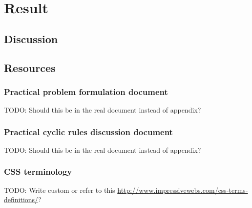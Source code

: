 \documentclass[a4paper,11pt]{kth-mag}
\begin{document}
  \part{Result}
    \chapter{Discussion}
  \printbibliography
    \appendix
    \addappheadtotoc
      \chapter{Resources}
        \section{Practical problem formulation document}\label{sec:problem-formulation}
          TODO: Should this be in the real document instead of appendix?          
        \section{Practical cyclic rules discussion document}\label{sec:cyclic-rules}
          TODO: Should this be in the real document instead of appendix?
        \section{CSS terminology}
          TODO: Write custom or refer to this \url{http://www.impressivewebs.com/css-terms-definitions/}?
\end{document}

